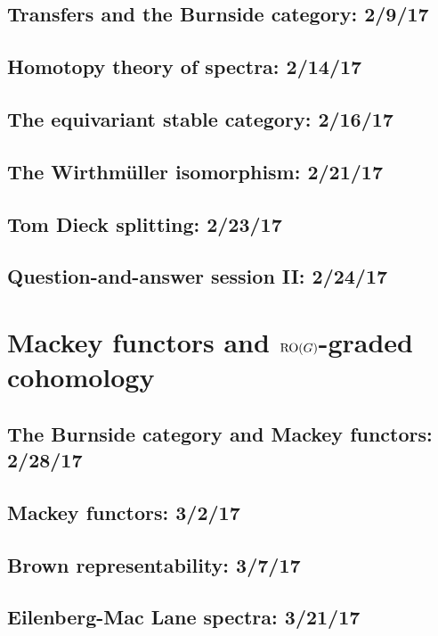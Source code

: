 \documentclass[openany]{style_EHT}
\begin{document}
\section{Transfers and the Burnside category: 2/9/17}
	
\section{Homotopy theory of spectra: 2/14/17}
	
\section{The equivariant stable category: 2/16/17}
	
\section{The Wirthmüller isomorphism: 2/21/17}
	
\section{Tom Dieck splitting: 2/23/17}
	
\section{Question-and-answer session II: 2/24/17}
	

\chapter{Mackey functors and $\mathrm{RO}(G)$-graded cohomology}
\section{The Burnside category and Mackey functors: 2/28/17}
	
\section{Mackey functors: 3/2/17}
	
\section{Brown representability: 3/7/17}
	
\section{Eilenberg-Mac Lane spectra: 3/21/17}
	
\end{document}
